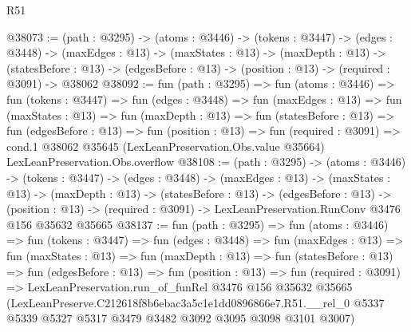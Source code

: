 \begin{lexlean}{R51}
\begin{coremodule}
@38073 := (path : @3295) ->
  (atoms : @3446) ->
  (tokens : @3447) ->
  (edges : @3448) ->
  (maxEdges : @13) ->
  (maxStates : @13) ->
  (maxDepth : @13) ->
  (statesBefore : @13) -> (edgesBefore : @13) -> (position : @13) -> (required : @3091) -> @38062
@38092 := fun (path : @3295) =>
  fun (atoms : @3446) =>
  fun (tokens : @3447) =>
  fun (edges : @3448) =>
  fun (maxEdges : @13) =>
  fun (maxStates : @13) =>
  fun (maxDepth : @13) =>
  fun (statesBefore : @13) =>
  fun (edgesBefore : @13) =>
  fun (position : @13) =>
  fun (required : @3091) =>
  cond.{1} @38062 @35645 (LexLeanPreservation.Obs.value @35664) LexLeanPreservation.Obs.overflow
@38108 := (path : @3295) ->
  (atoms : @3446) ->
  (tokens : @3447) ->
  (edges : @3448) ->
  (maxEdges : @13) ->
  (maxStates : @13) ->
  (maxDepth : @13) ->
  (statesBefore : @13) ->
  (edgesBefore : @13) ->
  (position : @13) -> (required : @3091) -> LexLeanPreservation.RunConv @3476 @156 @35632 @35665
@38137 := fun (path : @3295) =>
  fun (atoms : @3446) =>
  fun (tokens : @3447) =>
  fun (edges : @3448) =>
  fun (maxEdges : @13) =>
  fun (maxStates : @13) =>
  fun (maxDepth : @13) =>
  fun (statesBefore : @13) =>
  fun (edgesBefore : @13) =>
  fun (position : @13) =>
  fun (required : @3091) =>
  LexLeanPreservation.run_of_funRel
    @3476
    @156
    @35632
    @35665
    (LexLeanPreserve.C212618f8b6ebac3a5c1e1dd0896866e7.R51.__rel_0
      @5337
      @5339
      @5327
      @5317
      @3479
      @3482
      @3092
      @3095
      @3098
      @3101
      @3007)
\end{coremodule}
\end{lexlean}
